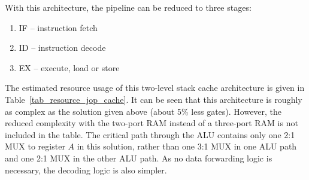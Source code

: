 With this architecture, the pipeline can be reduced to three stages:
%
\begin{enumerate}
\item IF -- instruction fetch
\item ID -- instruction decode
\item EX -- execute, load or store
\end{enumerate}
%
The estimated resource usage of this two-level stack cache
architecture is given in Table~\ref{tab_resource_jop_cache}. It can
be seen that this architecture is roughly as complex as the solution
given above (about 5{\%} less gates). However, the reduced
complexity with the two-port RAM instead of a three-port RAM is not
included in the table. The critical path through the ALU contains
only one 2:1 MUX to register $A$ in this solution, rather than one
3:1 MUX in one ALU path and one 2:1 MUX in the other ALU path. As no
data forwarding logic is necessary, the decoding logic is also
simpler.

